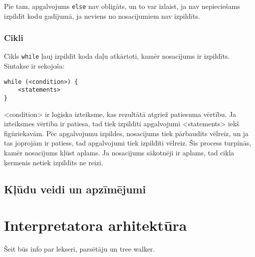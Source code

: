 \documentclass[12pt,a4paper]{report}
\begin{document}
Pie tam, apgalvojums \texttt{else} nav obligāts, un to var izlaist, ja nav nepieciešams izpildīt kodu gadījumā, ja neviens no nosacījumiem nav izpildīts.

\subsection{Cikli}
Cikls \texttt{while} ļauj izpildīt koda daļu atkārtoti, kamēr nosacījums ir izpildīts. Sintakse ir sekojoša:
\begin{verbatim}
while (<condition>) {
    <statements>
}
\end{verbatim}

<condition> ir loģiska izteiksme, kas rezultātā atgriež patiesuma vērtību. Ja izteiksmes vērtība ir patiesa, tad tiek izpildīti apgalvojumi <statements> iekš figūriekavām. Pēc apgalvojumu izpildes, nosacījums tiek pārbaudīts vēlreiz, un ja tas joprojām ir patiess, tad apgalvojumi tiek izpildīti vēlreiz. Šis process turpinās, kamēr nosacījums kļūst aplams. Ja nosacījums sākotnēji ir aplams, tad cikla ķermenis netiek izpildīts ne reizi.

\section{Kļūdu veidi un apzīmējumi}

\chapter{Interpretatora arhitektūra}
\label{chap:arch}

Šeit būs info par lekseri, parsētāju un tree walker.



   
\end{document}
